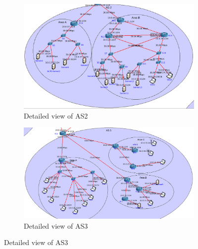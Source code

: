     \begin{figure} \ContinuedFloat
    \begin{subfigure}[t]{\textwidth}
    \centering
    \includegraphics[scale=0.5]{img/topology-experiments-AS2.png}
    \caption{Detailed view of AS2}    
    \label{fig:exp-as2}
    \end{subfigure}

    \begin{subfigure}[t]{\textwidth}
    \centering
    \includegraphics[scale=0.5]{img/topology-experiments-AS3.png}
    \caption{Detailed view of AS3}    
    \label{fig:exp-as3}
    \end{subfigure}
    \end{figure}

